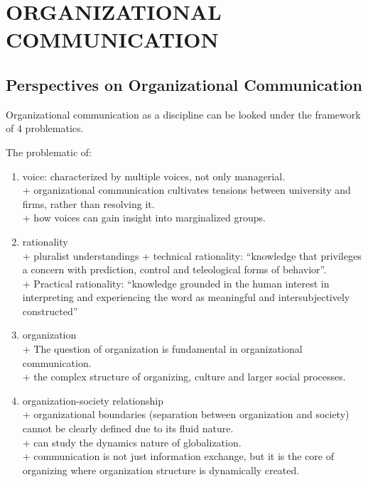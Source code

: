 \documentclass[
]{book}
\providecommand{\tightlist}{%
  \setlength{\itemsep}{0pt}\setlength{\parskip}{0pt}}
\begin{document}
\hypertarget{part-organizational-communication}{%
\part{ORGANIZATIONAL COMMUNICATION}\label{part-organizational-communication}}

\hypertarget{perspectives-on-organizational-communication}{%
\chapter{Perspectives on Organizational Communication}\label{perspectives-on-organizational-communication}}

\citep{Mumby_1996}
Organizational communication as a discipline can be looked under the framework of 4 problematics.

The problematic of:

\begin{enumerate}
\def\labelenumi{\arabic{enumi}.}
\tightlist
\item
  voice: characterized by multiple voices, not only managerial.\\
  + organizational communication cultivates tensions between university and firms, rather than resolving it.\\
  + how voices can gain insight into marginalized groups.\\
\item
  rationality\\
  + pluralist understandings
  + technical rationality: ``knowledge that privileges a concern with prediction, control and teleological forms of behavior''.\\
  + Practical rationality: ``knowledge grounded in the human interest in interpreting and experiencing the word as meaningful and intersubjectively constructed''\\
\item
  organization\\
  + The question of organization is fundamental in organizational communication.\\
  + the complex structure of organizing, culture and larger social processes.\\
\item
  organization-society relationship\\
  + organizational boundaries (separation between organization and society) cannot be clearly defined due to its fluid nature.\\
  + can study the dynamics nature of globalization.\\
  + communication is not just information exchange, but it is the core of organizing where organization structure is dynamically created.
\end{enumerate}
\end{document}
